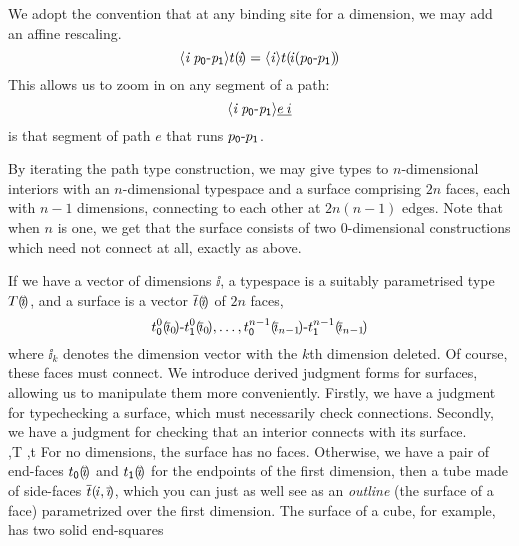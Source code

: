 \documentclass{article}
\begin{document}
We adopt the convention that at any binding site for a dimension, we may add
an affine rescaling.
\[
\inr{\vi\:\rai p}{t\sv\vi} = \inr\vi{t\sv{\muxi\vi p}}
\]
This allows us to zoom in on any segment of a path:
\[
\inr{\vi\:\rai p}{\N{e\:i}}
\]
is that segment of path $e$ that runs $\rai p$.

By iterating the path type construction, we may give types to $n$-dimensional
interiors with an $n$-dimensional typespace and a surface comprising $2n$ faces,
each with $n-1$ dimensions, connecting to each other at $2n(n-1)$ edges.
Note that when $n$ is one, we get that the surface consists of two $0$-dimensional
constructions which need not connect at all, exactly as above.

\newcommand{\SURF}{\nabla}
If we have a vector of dimensions $\ii$, a typespace is a suitably parametrised
type $T\sv\ii$, and a surface is a vector $\myv t\sv\ii$ of $2n$ faces,
\[
\ra{\sze{t^0}\sv{\ii_0}}{\sun{t^0}\sv{\ii_0}},\ldots,
\ra{\sze{t^{n-1}}\sv{\ii_{n-1}}}{\sun{t^{n-1}}\sv{\ii_{n-1}}}
\]
where $\ii_k$ denotes the dimension vector with the $k$th dimension deleted.
Of course, these faces must connect. We introduce derived judgment forms for
surfaces, allowing us to manipulate them more conveniently. Firstly, we have
a judgment for typechecking a surface, which must necessarily check connections.
Secondly, we have a judgment for checking that an interior connects with its surface.
\RULES{\ii\vdash\TY\ni \INP T\sv\ii\quad
       \JF{\SURF\ii\vdash \INP T\sv\ii \ni
    \myv{\SUB t}\sv\ii}}
{
\Axiom{\SURF\vdash T \ni} \\
\Rule{\begin{array}{@{}c@{}}
      \ii\vdash T\sv{\pze,\ii}\ni \sze t\sv\ii \quad
      \ii\vdash T\sv{\pun,\ii}\ni \sun t\sv\ii \quad
      \vi\vdash\SURF\ii\vdash T\sv{\vi,\ii,}\ni\myv t\sv{\vi,\ii}
      \\
      \SURF\ii\vdash T\sv{\pze,\ii}\ni
         \sze t\sv\ii = \myv t\sv{\pze,\ii} \quad
      \SURF\ii\vdash T\sv{\pun,\ii}\ni
         \sun t\sv\ii = \myv t\sv{\pun,\ii}
     \end{array}}
     {\SURF\vi,\ii\vdash T\sv{\vi,\ii}\ni
       ,\myv t\sv{\vi,\ii}}
}
For no dimensions, the surface has no faces. Otherwise, we have a pair of
end-faces $\sze t\sv\ii$ and $\sun t\sv\ii$ for the endpoints of the first dimension,
then a tube made of side-faces $\myv t\sv{\vi,\ii}$,
which you can just as well see as an \emph{outline} (the surface of a face) parametrized
over the first dimension. The surface of a cube, for example, has two solid end-squares
\end{document}
